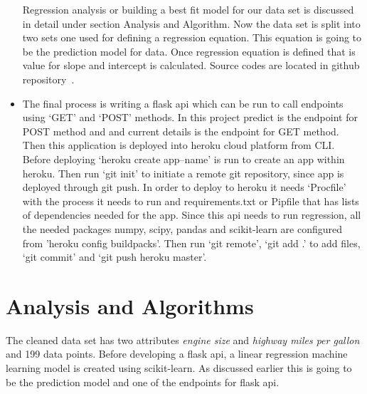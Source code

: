 \begin{itemize}
    Regression analysis or building a best fit model for our data set is
   discussed in detail under section Analysis and Algorithm. Now the data
   set is split into two sets one used for defining a regression 
   equation. This equation is going to be the prediction model for data.
   Once regression equation is defined
   that is value for slope and intercept is calculated.   
   Source codes are located in github repository~\cite{hid-sp18-415-regression}.
    \item The final process is writing a flask api which can be run to call 
 endpoints using `GET' and `POST' methods. In this project predict is the
 endpoint for POST method and and current details is the endpoint for GET
 method. Then this application is deployed into heroku cloud platform from
 CLI. Before deploying `heroku create app--name' is run to create an app within
 heroku. Then run `git init' to initiate a remote git repository, since app is 
 deployed through git push. In order to deploy to heroku it needs `Procfile'
 with the process it needs to run and requirements.txt or Pipfile that has lists 
 of dependencies needed for the app. Since this api needs to run regression, all
 the needed packages numpy, scipy, pandas and scikit-learn are configured from 
 'heroku config buildpacks'. Then run `git remote', `git add .' to add files,  
 `git commit' and `git push heroku master'.
\end{itemize}    

\section{Analysis and Algorithms}
  The cleaned data set has two attributes \textit{engine size} and
  \textit{highway miles per gallon} and 199 data points. Before developing
   a flask api, a linear regression machine learning model is created using
   scikit-learn. As discussed earlier this is going to be the prediction model
   and one of the endpoints for flask api.

